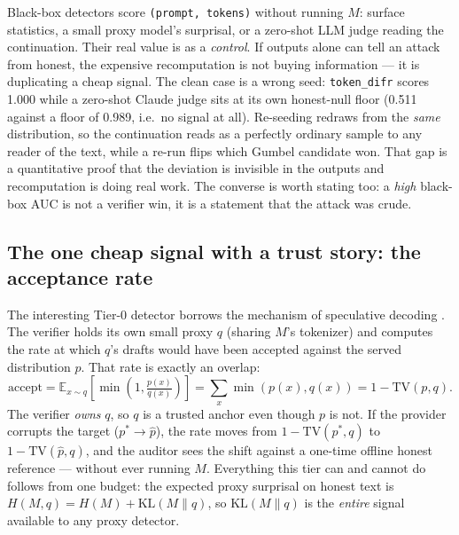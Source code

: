 \documentclass[11pt]{article}
\newcommand{\td}{\texttt{token\_difr}}
\begin{document}
Black-box detectors score \texttt{(prompt, tokens)} without running $M$: surface
statistics, a small proxy model's surprisal, or a zero-shot LLM judge reading the
continuation. Their real value is as a \emph{control}. If outputs alone can tell an
attack from honest, the expensive recomputation is not buying information --- it is
duplicating a cheap signal. The clean case is a wrong seed: \td{} scores 1.000 while a
zero-shot Claude judge sits at its own honest-null floor (0.511 against a floor of
0.989, i.e.\ no signal at all). Re-seeding redraws from the \emph{same} distribution,
so the continuation reads as a perfectly ordinary sample to any reader of the text,
while a re-run flips which Gumbel candidate won. That gap is a quantitative proof that
the deviation is invisible in the outputs and recomputation is doing real work. The
converse is worth stating too: a \emph{high} black-box AUC is not a verifier win, it
is a statement that the attack was crude.

\subsection{The one cheap signal with a trust story: the acceptance rate}

The interesting Tier-0 detector borrows the mechanism of speculative decoding
\cite{spec}. The verifier holds its own small proxy $q$ (sharing $M$'s tokenizer)
and computes the rate at which $q$'s drafts would have been accepted against the
served distribution $p$. That rate is exactly an overlap:
\[
\mathrm{accept} = \mathbb{E}_{x\sim q}\!\left[\min\!\left(1, \tfrac{p(x)}{q(x)}\right)\right]
= \sum_x \min(p(x), q(x)) = 1 - \mathrm{TV}(p, q).
\]
The verifier \emph{owns} $q$, so $q$ is a trusted anchor even though $p$ is not. If
the provider corrupts the target ($p^* \to \hat{p}$), the rate moves from
$1-\mathrm{TV}(p^*,q)$ to $1-\mathrm{TV}(\hat{p},q)$, and the auditor sees the shift
against a one-time offline honest reference --- without ever running $M$. Everything
this tier can and cannot do follows from one budget: the expected proxy surprisal on
honest text is $H(M,q) = H(M) + \mathrm{KL}(M \| q)$, so $\mathrm{KL}(M\|q)$ is the
\emph{entire} signal available to any proxy detector.
\end{document}
